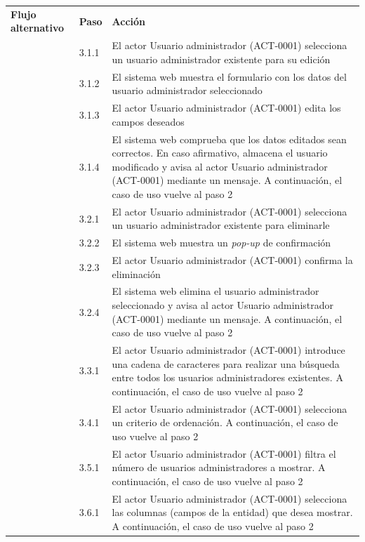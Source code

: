 \documentclass[12pt,a4paper, twoside]{report}
\begin{document}
\begin{longtable}{|p{3cm}|p{1cm}|p{12.5cm}|}
		{\cellcolor{Gainsboro}\textbf{Flujo alternativo}} & \textbf{Paso} & \textbf{Acción}  	\\ \cline{2-3} 
		\cellcolor{Gainsboro} & 3.1.1 & El actor Usuario administrador (ACT-0001) selecciona un usuario administrador existente para su edición \\ \cline{2-3} 
		\cellcolor{Gainsboro} & 3.1.2 & El sistema web muestra el formulario con los datos del usuario administrador seleccionado \\ \cline{2-3} 
		\cellcolor{Gainsboro} & 3.1.3 & El actor Usuario administrador (ACT-0001) edita los campos deseados \\ \cline{2-3} 
		\cellcolor{Gainsboro} & 3.1.4 & El sistema web comprueba que los datos editados sean correctos. En caso afirmativo, almacena el usuario modificado y avisa al actor Usuario administrador (ACT-0001) mediante un mensaje. A continuación, el caso de uso vuelve al paso 2 \\ \cline{2-3} 
		\cellcolor{Gainsboro} & 3.2.1 & El actor Usuario administrador (ACT-0001) selecciona un usuario administrador existente para eliminarle \\ \cline{2-3} 
		\cellcolor{Gainsboro} & 3.2.2 & El sistema web muestra un \textit{pop-up} de confirmación \\ \cline{2-3} 
		\cellcolor{Gainsboro} & 3.2.3 & El actor Usuario administrador (ACT-0001) confirma la eliminación \\ \cline{2-3} 
		\cellcolor{Gainsboro} & 3.2.4 & El sistema web elimina el usuario administrador seleccionado y avisa al actor Usuario administrador (ACT-0001) mediante un mensaje. A continuación, el caso de uso vuelve al paso 2 \\ \cline{2-3} 
		\cellcolor{Gainsboro} & 3.3.1 & El actor Usuario administrador (ACT-0001) introduce una cadena de caracteres para realizar una búsqueda entre todos los usuarios administradores existentes. A continuación, el caso de uso vuelve al paso 2 \\ \cline{2-3} 
		\cellcolor{Gainsboro} & 3.4.1 & El actor Usuario administrador (ACT-0001) selecciona un criterio de ordenación. A continuación, el caso de uso vuelve al paso 2 \\ \cline{2-3} 
		\cellcolor{Gainsboro} & 3.5.1 & El actor Usuario administrador (ACT-0001) filtra el número de usuarios administradores a mostrar. A continuación, el caso de uso vuelve al paso 2 \\ \cline{2-3} 
		\cellcolor{Gainsboro} & 3.6.1 & El actor Usuario administrador (ACT-0001) selecciona las columnas (campos de la entidad) que desea mostrar. A continuación, el caso de uso vuelve al paso 2 \\ \cline{2-3} 

\end{longtable}
\end{document}
